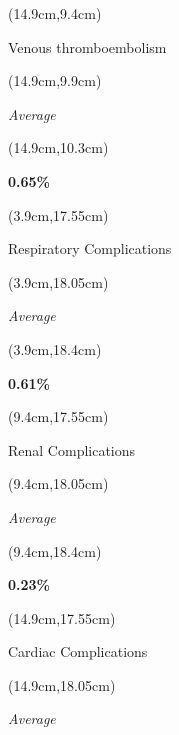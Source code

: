 \documentclass[
  11pt,
  landscape]{article}
\begin{document}
\begin{textblock*}{5cm}(14.9cm,9.4cm) %
    \centerline{\small{Venous thromboembolism}}
\end{textblock*}

\begin{textblock*}{5cm}(14.9cm,9.9cm) %
    \small \centerline{\textit{Average}}
\end{textblock*}

\begin{textblock*}{5cm}(14.9cm,10.3cm) %
    \centerline{\textbf{0.65\%}}
\end{textblock*}

\begin{textblock*}{5cm}(3.9cm,17.55cm) %
    \centerline{\small{Respiratory Complications}}
\end{textblock*}

\begin{textblock*}{5cm}(3.9cm,18.05cm) %
    \small \centerline{\textit{Average}}
\end{textblock*}

\begin{textblock*}{5cm}(3.9cm,18.4cm) %
    \centerline{\textbf{0.61\%}}
\end{textblock*}

\begin{textblock*}{5cm}(9.4cm,17.55cm) %
    \centerline{\small{Renal Complications}}
\end{textblock*}

\begin{textblock*}{5cm}(9.4cm,18.05cm) %
    \small \centerline{\textit{Average}}
\end{textblock*}

\begin{textblock*}{5cm}(9.4cm,18.4cm) %
    \centerline{\textbf{0.23\%}}
\end{textblock*}

\begin{textblock*}{5cm}(14.9cm,17.55cm) %
    \centerline{\small{Cardiac Complications}}
\end{textblock*}

\begin{textblock*}{5cm}(14.9cm,18.05cm) %
    \small \centerline{\textit{Average}}
\end{textblock*}
\end{document}
